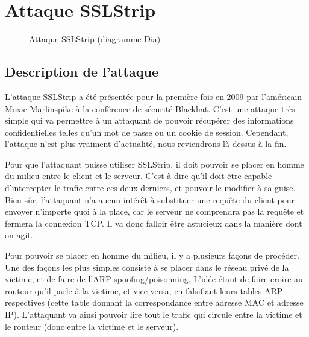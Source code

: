 \chapter{Attaque SSLStrip}

\label{sec:sslstrip}

\begin{figure}[H]
  \caption{Attaque SSLStrip (diagramme Dia)}
\end{figure}

\section{Description de l'attaque}

L'attaque SSLStrip a été présentée pour la première fois en 2009 par l'américain Moxie Marlinspike à la conférence de sécurité Blackhat. C'est une attaque très simple qui va permettre à un attaquant de pouvoir récupérer des informations confidentielles telles qu'un mot de passe ou un cookie de session. Cependant, l'attaque n'est plus vraiment d'actualité, nous reviendrons là dessus à la fin.

Pour que l'attaquant puisse utiliser SSLStrip, il doit pouvoir se placer en homme du milieu entre le client et le serveur. C'est à dire qu'il doit être capable d'intercepter le trafic entre ces deux derniers, et pouvoir le modifier à sa guise. Bien sûr, l'attaquant n'a aucun intérêt à substituer une requête du client pour envoyer n'importe quoi à la place, car le serveur ne comprendra pas la requête et fermera la connexion TCP. Il va donc falloir être astucieux dans la manière dont on agit.

Pour pouvoir se placer en homme du milieu, il y a plusieurs façons de procéder. Une des façons les plus simples consiste à se placer dans le réseau privé de la victime, et de faire de l'ARP spoofing/poisonning. L'idée étant de faire croire au routeur qu'il parle à la victime, et vice versa, en falsifiant leurs tables ARP respectives (cette table donnant la correspondance entre adresse MAC et adresse IP). L'attaquant va ainsi pouvoir lire tout le trafic qui circule entre la victime et le routeur (donc entre la victime et le serveur).


